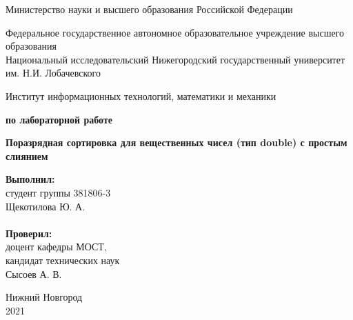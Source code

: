 \documentclass{report}
\begin{document}
\begin{titlepage}

\begin{center}
Министерство науки и высшего образования Российской Федерации
\end{center}

\begin{center}
Федеральное государственное автономное образовательное учреждение высшего образования \\
Национальный исследовательский Нижегородский государственный университет им. Н.И. Лобачевского
\end{center}

\begin{center}
Институт информационных технологий, математики и механики
\end{center}

\vspace{4em}

\begin{center}
\textbf{ по лабораторной работе} \\
\end{center}
\begin{center}
\textbf{\Large Поразрядная сортировка для вещественных чисел (тип double) с простым слиянием} \\
\end{center}

\vspace{4em}

\newbox{\lbox}
\newlength{\maxl}
\setlength{\maxl}{\wd\lbox}
\hfill\parbox{7cm}{
\hspace*{5cm}\hspace*{-5cm}\textbf{Выполнил:} \\ студент группы 381806-3 \\ Щекотилова Ю. А.\\
\\
\hspace*{5cm}\hspace*{-5cm}\textbf{Проверил:}\\ доцент кафедры МОСТ, \\ кандидат технических наук \\ Сысоев А. В.\\
}
\vspace{\fill}

\begin{center} Нижний Новгород \\ 2021 \end{center}

\end{titlepage}
\end{document}
